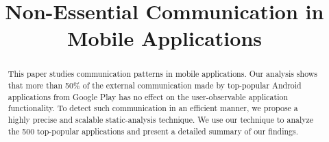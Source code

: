 \documentclass[conference]{IEEEtran}
\begin{document}

\title{Non-Essential Communication in Mobile Applications}


\author{
}



\maketitle
\begin{abstract}
This paper studies communication patterns in mobile applications. Our analysis
shows that more than 50\% of the external communication made by top-popular
Android applications from Google Play has no effect on the user-observable
application functionality. To detect such communication in an efficient
manner, we propose a highly precise and scalable static-analysis technique. We
use our technique to analyze the 500 top-popular applications and present a
detailed summary of our findings.
\end{abstract}
\end{document}
